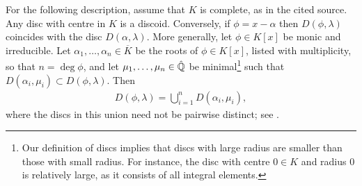 \begin{remark}
    For the following description, assume that $K$ is complete, as in the cited source.
    Any disc with centre in $K$ is a discoid.
    Conversely, if $\phi = x - \alpha$ then $D(\phi, \lambda)$ coincides with the disc $D(\alpha, \lambda)$.
    More generally, let $\phi\in K[x]$ be monic and irreducible.
    Let $\alpha_1,\dots,\alpha_n\in\overline K$ be the roots of $\phi \in K[x]$, listed with multiplicity, so that $n=\deg\phi$,
    and let $\mu_1,\dots,\mu_n \in \hat{\mathbb Q}$ be minimal\footnote{
        Our definition of discs implies that discs with large radius are smaller than those with small radius.
        For instance, the disc with centre $0\in K$ and radius $0$ is relatively large, as it consists of all integral elements.
    } such that $D(\alpha_i,\mu_i) \subset D(\phi,\lambda)$.
    Then
    \begin{align}
        D(\phi,\lambda) = \bigcup_{i=1}^n D(\alpha_i,\mu_i),
    \end{align}
    where the discs in this union need not be pairwise distinct; see \cite[Lemma 4.43]{Rueth}.
\end{remark}
